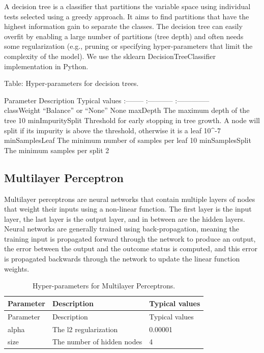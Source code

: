 \documentclass[11pt]{book}
\theoremstyle{definition}
\theoremstyle{definition}
\theoremstyle{definition}
\theoremstyle{remark}
\begin{document}
A decision tree is a classifier that partitions the variable space using
individual tests selected using a greedy approach. It aims to find
partitions that have the highest information gain to separate the
classes. The decision tree can easily overfit by enabling a large number
of partitions (tree depth) and often needs some regularization (e.g.,
pruning or specifying hyper-parameters that limit the complexity of the
model). We use the sklearn DecisionTreeClassifier implementation in
Python.  

Table: \label{tab:decisionTreeParameters} Hyper-parameters for decision
trees.

\textbar{} Parameter\textbar{} Description \textbar{} Typical values
\textbar{} \textbar{}:-------- \textbar{}:-----------
\textbar{}:-------------- \textbar{}\\
\textbar{} classWeight \textbar{} ``Balance'' or ``None'' \textbar{}
None \textbar{} \textbar{} maxDepth \textbar{} The maximum depth of the
tree \textbar{} 10 \textbar{} \textbar{} minImpuritySplit \textbar{}
Threshold for early stopping in tree growth. A node will split if its
impurity is above the threshold, otherwise it is a leaf \textbar{}
10\^{}-7\textbar{} \textbar{} minSamplesLeaf \textbar{} The minimum
number of samples per leaf \textbar{} 10 \textbar{} \textbar{}
minSamplesSplit \textbar{} The minimum samples per split \textbar{} 2
\textbar{}

\subsection{Multilayer Perceptron}\label{multilayer-perceptron}

Multilayer perceptrons are neural networks that contain multiple layers
of nodes that weight their inputs using a non-linear function. The first
layer is the input layer, the last layer is the output layer, and in
between are the hidden layers. Neural networks are generally trained
using back-propagation, meaning the training input is propagated forward
through the network to produce an output, the error between the output
and the outcome status is computed, and this error is propagated
backwards through the network to update the linear function weights.
  

\begin{longtable}[]{@{}lll@{}}
\caption{\label{tab:mpParameters} Hyper-parameters for Multilayer
Perceptrons.}\tabularnewline
\toprule
Parameter & Description & Typical values\tabularnewline
\midrule
\endfirsthead
\toprule
Parameter & Description & Typical values\tabularnewline
\midrule
\endhead
alpha & The l2 regularization & 0.00001\tabularnewline
size & The number of hidden nodes & 4\tabularnewline
\bottomrule
\end{longtable}
\end{document}
